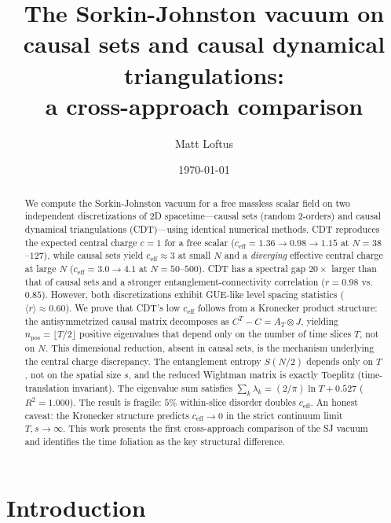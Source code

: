 \documentclass[aps,prd,twocolumn,superscriptaddress,nofootinbib]{revtex4-2}
\begin{document}
\title{The Sorkin-Johnston vacuum on causal sets and causal dynamical triangulations:\\a cross-approach comparison}

\author{Matt Loftus}

\date{\today}

\begin{abstract}
We compute the Sorkin-Johnston vacuum for a free massless scalar field on two independent discretizations of 2D spacetime---causal sets (random 2-orders) and causal dynamical triangulations (CDT)---using identical numerical methods. CDT reproduces the expected central charge $c = 1$ for a free scalar ($c_{\mathrm{eff}} = 1.36 \to 0.98 \to 1.15$ at $N = 38$--$127$), while causal sets yield $c_{\mathrm{eff}} \approx 3$ at small $N$ and a \emph{diverging} effective central charge at large $N$ ($c_{\mathrm{eff}} = 3.0 \to 4.1$ at $N = 50$--$500$). CDT has a spectral gap $20\times$ larger than that of causal sets and a stronger entanglement-connectivity correlation ($r = 0.98$ vs.\ $0.85$). However, both discretizations exhibit GUE-like level spacing statistics ($\langle r \rangle \approx 0.60$). We prove that CDT's low $c_{\mathrm{eff}}$ follows from a Kronecker product structure: the antisymmetrized causal matrix decomposes as $C^T - C = A_T \otimes J$, yielding $n_{\mathrm{pos}} = \lfloor T/2 \rfloor$ positive eigenvalues that depend only on the number of time slices $T$, not on $N$. This dimensional reduction, absent in causal sets, is the mechanism underlying the central charge discrepancy. The entanglement entropy $S(N/2)$ depends only on $T$, not on the spatial size $s$, and the reduced Wightman matrix is exactly Toeplitz (time-translation invariant). The eigenvalue sum satisfies $\sum_k \lambda_k = (2/\pi)\ln T + 0.527$ ($R^2 = 1.000$). The result is fragile: $5\%$ within-slice disorder doubles $c_{\mathrm{eff}}$. An honest caveat: the Kronecker structure predicts $c_{\mathrm{eff}} \to 0$ in the strict continuum limit $T, s \to \infty$. This work presents the first cross-approach comparison of the SJ vacuum and identifies the time foliation as the key structural difference.
\end{abstract}

\maketitle

\section{Introduction}
\end{document}
